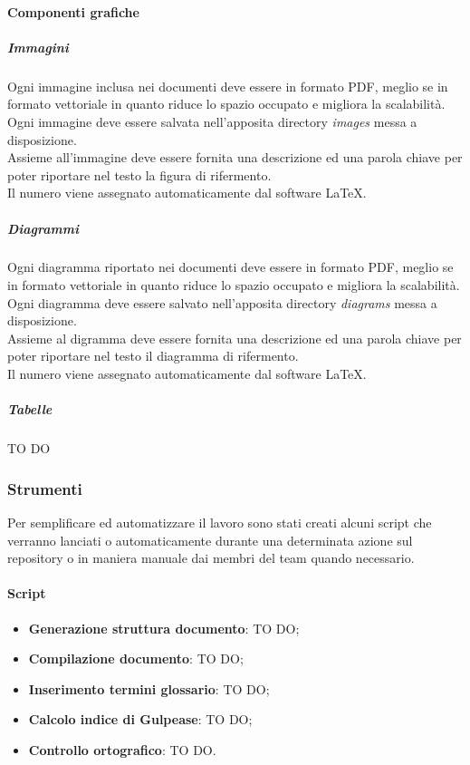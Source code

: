 			\paragraph{Componenti grafiche}
				
				\subparagraph{Immagini}
				Ogni immagine inclusa nei documenti deve essere in formato PDF, meglio se in formato vettoriale in quanto riduce lo spazio occupato e migliora la scalabilità.\\
				Ogni immagine deve essere salvata nell'apposita directory \emph{images} messa a disposizione.\\
				Assieme all'immagine deve essere fornita una descrizione ed una parola chiave per poter riportare nel testo la figura di rifermento.\\
				Il numero viene assegnato automaticamente dal software \LaTeX.

				\subparagraph{Diagrammi}
				Ogni diagramma riportato nei documenti deve essere in formato PDF, meglio se in formato vettoriale in quanto riduce lo spazio occupato e migliora la scalabilità.\\
				Ogni diagramma deve essere salvato nell'apposita directory \emph{diagrams} messa a disposizione.\\
				Assieme al digramma deve essere fornita una descrizione ed una parola chiave per poter riportare nel testo il diagramma di rifermento.\\
				Il numero viene assegnato automaticamente dal software \LaTeX.
				
				\subparagraph{Tabelle} TO DO
		
		\subsubsection{Strumenti} %
		\label{ssub:strumenti}
		Per semplificare ed automatizzare il lavoro sono stati creati alcuni script che verranno lanciati o automaticamente durante una determinata azione sul repository o in maniera manuale dai membri del team quando necessario.
			\paragraph{Script} %
			\label{par:script_doc}
				\begin{itemize}
					\item \textbf{Generazione struttura documento}: TO DO;
					\item \textbf{Compilazione documento}: TO DO;
					\item \textbf{Inserimento termini glossario}: TO DO;
					\item \textbf{Calcolo indice di Gulpease}: TO DO;
					\item \textbf{Controllo ortografico}: TO DO.
				\end{itemize}
			
